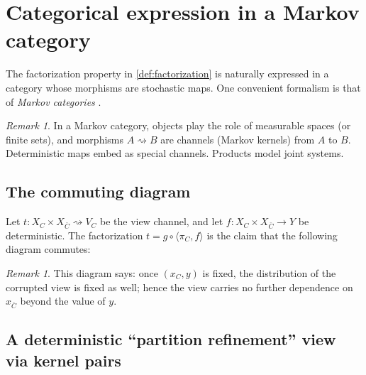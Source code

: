 \documentclass[11pt,a4paper]{article}
\theoremstyle{definition}
\theoremstyle{remark}
\newtheorem{remark}[theorem]{Remark}
\begin{document}
\section{Categorical expression in a Markov category}
\label{sec:categorical}

The factorization property in \cref{def:factorization} is naturally expressed in a category whose morphisms are stochastic maps. One convenient formalism is that of \emph{Markov categories} \cite[Section~2]{Fritz2020}.

\begin{remark}
\label{rem:markov-category-brief}
In a Markov category, objects play the role of measurable spaces (or finite sets), and morphisms $A\rightsquigarrow B$ are channels (Markov kernels) from $A$ to $B$. Deterministic maps embed as special channels. Products model joint systems.
\end{remark}

\subsection{The commuting diagram}
\label{sec:commuting-diagram}

Let $t : X_C\times X_{\bar C} \rightsquigarrow V_C$ be the view channel, and let $f : X_C\times X_{\bar C}\to Y$ be deterministic. The factorization $t=g\circ\langle \pi_C,f\rangle$ is the claim that the following diagram commutes:

\begin{center}
\end{center}

\begin{remark}
\label{rem:categorical-reading}
This diagram says: once $(x_C,y)$ is fixed, the distribution of the corrupted view is fixed as well; hence the view carries no further dependence on $x_{\bar C}$ beyond the value of $y$.
\end{remark}

\subsection{A deterministic ``partition refinement'' view via kernel pairs}
\label{sec:kernel-pairs}
\end{document}
